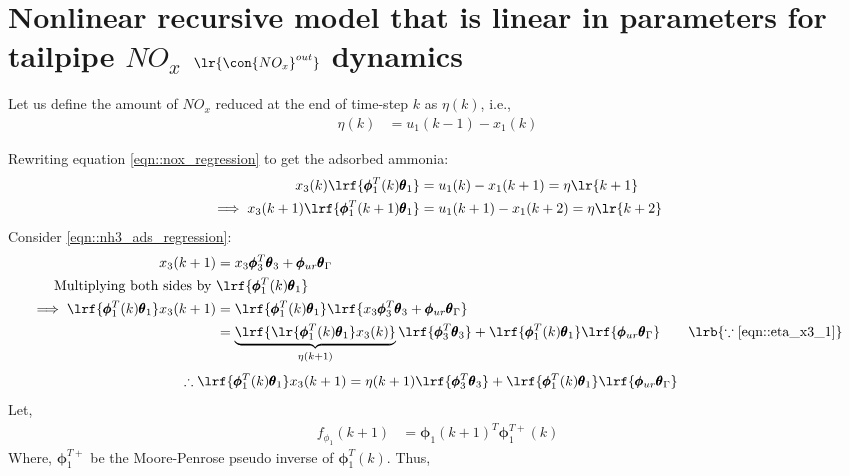 \newpage
\section{Nonlinear recursive model that is linear in parameters for tailpipe $NO_x$ $\lr{\con{NO_x}^{out}}$ dynamics}

Let us define the amount of $NO_x$ reduced at the end of time-step $k$ as $\eta(k)$, i.e.,
\begin{align}
        \eta (k) &= u_1(k-1) - x_1(k)
        \label{eqn::eta_proc}
\end{align}

Rewriting equation \ref{eqn::nox_regression} to get the adsorbed ammonia:
\begin{align}
        x_3(k) \lrf{\pmb \phi_1^T(k) \pmb \theta_1} &= u_1(k)-x_1(k+1)  = \eta\lr{k+1}
        \label{eqn::eta_x3_1}\\
        \implies x_3(k+1) \lrf{\pmb \phi_1^T(k+1) \pmb \theta_1} &= u_1(k+1)-x_1(k+2)  = \eta\lr{k+2}
        \label{eqn::eta_x3_2}
\end{align}
Consider \ref{eqn::nh3_ads_regression}:
\begin{align*}
     x_3(k+1) &= x_3 \pmb \phi_3^T \pmb \theta_3 + \pmb \phi_{ur} \pmb \theta_\Gamma\\
     \text{Multiplying both sides by } & \lrf{\pmb \phi_1^T(k) \pmb \theta_1} \\
     \implies \lrf{\pmb \phi_1^T(k) \pmb \theta_1} x_3(k+1) &= \lrf{\pmb \phi_1^T(k) \pmb \theta_1} \lrf{x_3 \pmb \phi_3^T \pmb \theta_3 + \pmb \phi_{ur} \pmb \theta_\Gamma}\\
     &= \underbrace{\lrf{\lr{\pmb \phi_1^T(k) \pmb \theta_1}x_3(k)}}_{\eta(k+1)}
      \lrf{\pmb \phi_3^T \pmb \theta_3}
     + \lrf{\pmb \phi_1^T(k) \pmb \theta_1} \lrf{\pmb \phi_{ur} \pmb \theta_\Gamma}
     \qquad \lrb{\because \ref{eqn::eta_x3_1}}
\end{align*}
\begin{align}
        \therefore
        \lrf{\pmb \phi_1^T(k) \pmb \theta_1} x_3(k+1)
        &= \eta(k+1) \lrf{\pmb \phi_3^T \pmb \theta_3} + \lrf{\pmb \phi_1^T(k) \pmb \theta_1} \lrf{\pmb \phi_{ur} \pmb \theta_\Gamma}
        \label{eqn::r_nox_1}
\end{align}
Let,
\begin{align}
        f_{\phi_1}(k+1) &= \pmb \phi_1(k+1)^T \pmb \phi_1^{T+}(k)
        \label{eqn::f_phi_1}
\end{align}
Where, $\pmb \phi_1^{T+}$ be the Moore-Penrose pseudo inverse of $\pmb \phi_1^T(k)$. Thus,
